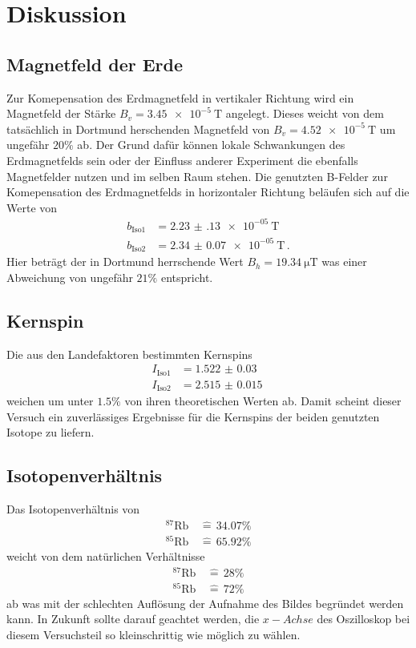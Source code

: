\newpage
\section{Diskussion}
\label{sec:diskussion}
\subsection{Magnetfeld der Erde}
Zur Komepensation des Erdmagnetfeld in vertikaler Richtung wird ein Magnetfeld der Stärke $B_v = \SI{3.45e-5}{\tesla}$ angelegt.
Dieses weicht von dem tatsächlich in Dortmund herschenden Magnetfeld von $B_v=\SI{4.52e-5}{\tesla}$ \cite{mag_DO_2} um ungefähr $20\%$ ab.
Der Grund dafür können lokale Schwankungen des Erdmagnetfelds sein oder der Einfluss anderer Experiment die ebenfalls Magnetfelder nutzen und im selben Raum stehen.
Die genutzten B-Felder zur Komepensation des Erdmagnetfelds in horizontaler Richtung beläufen sich auf die Werte von
\begin{align*}
b_\text{Iso1} & = \SI{2.23(13)e-05}{\tesla} \\
b_\text{Iso2} &= \SI{2.34(7)e-05}{\tesla} \, .
\end{align*}
Hier beträgt der in Dortmund herrschende Wert $B_h=\SI{19.34}{\micro\tesla}$ was einer Abweichung von ungefähr $21\%$ entspricht.
\subsection{Kernspin}
Die aus den Landefaktoren bestimmten Kernspins 
\begin{align*}
    I_\text{Iso1} &= \SI{1.522(30)}{}\\
    I_\text{Iso2} &= \SI{2.515(15)}{}
\end{align*}
weichen um unter $1.5\%$ von ihren theoretischen Werten ab.
Damit scheint dieser Versuch ein zuverlässiges Ergebnisse für die Kernspins der beiden genutzten Isotope zu liefern.
\subsection{Isotopenverhältnis}
Das Isotopenverhältnis von 
\begin{align*}
    ^{87}\text{Rb} \, &\widehat{=}\, 34.07\% \\
    ^{85}\text{Rb} \, &\widehat{=}\, 65.92\%
\end{align*}
weicht von dem natürlichen Verhältnisse
\begin{align*}
    ^{87}\text{Rb} \, &\widehat{=}\, 28\% \\
    ^{85}\text{Rb} \, &\widehat{=}\, 72\%
\end{align*}
ab was mit der schlechten Auflösung der Aufnahme des Bildes begründet werden kann.
In Zukunft sollte darauf geachtet werden, die $x-Achse$ des Oszilloskop bei diesem Versuchsteil so kleinschrittig wie möglich zu wählen.
